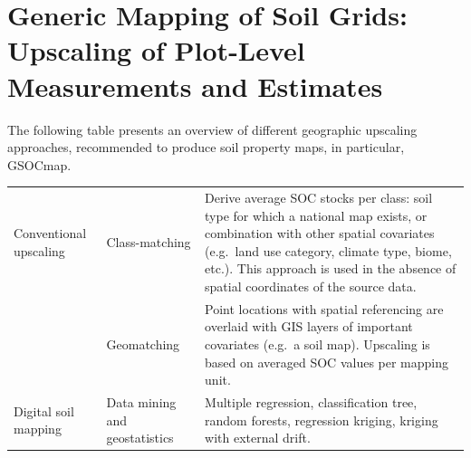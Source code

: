 \documentclass[10pt,b5paper,]{book}
\theoremstyle{definition}
\theoremstyle{definition}
\theoremstyle{definition}
\theoremstyle{remark}
\begin{document}
\hypertarget{generic-mapping-of-soil-grids-upscaling-of-plot-level-measurements-and-estimates}{%
\section{Generic Mapping of Soil Grids: Upscaling of Plot-Level
Measurements and
Estimates}\label{generic-mapping-of-soil-grids-upscaling-of-plot-level-measurements-and-estimates}}

The following table presents an overview of different geographic
upscaling approaches, recommended to produce soil property maps, in
particular, GSOCmap.

\begin{longtable}[]{@{}lll@{}}
\toprule
\endhead
\begin{minipage}[t]{0.20\columnwidth}\raggedright
Conventional upscaling \citep{lettens2004soil}\strut
\end{minipage} & \begin{minipage}[t]{0.27\columnwidth}\raggedright
Class-matching\strut
\end{minipage} & \begin{minipage}[t]{0.44\columnwidth}\raggedright
Derive average SOC stocks per class: soil type for which a national map
exists, or combination with other spatial covariates (e.g.~land use
category, climate type, biome, etc.). This approach is used in the
absence of spatial coordinates of the source data.\strut
\end{minipage}\tabularnewline
\begin{minipage}[t]{0.20\columnwidth}\raggedright
\strut
\end{minipage} & \begin{minipage}[t]{0.27\columnwidth}\raggedright
Geomatching\strut
\end{minipage} & \begin{minipage}[t]{0.44\columnwidth}\raggedright
Point locations with spatial referencing are overlaid with GIS layers of
important covariates (e.g.~a soil map). Upscaling is based on averaged
SOC values per mapping unit.\strut
\end{minipage}\tabularnewline
\begin{minipage}[t]{0.20\columnwidth}\raggedright
Digital soil mapping \citep{dobos2006digital}\strut
\end{minipage} & \begin{minipage}[t]{0.27\columnwidth}\raggedright
Data mining and geostatistics\strut
\end{minipage} & \begin{minipage}[t]{0.44\columnwidth}\raggedright
Multiple regression, classification tree, random forests, regression
kriging, kriging with external drift.\strut
\end{minipage}\tabularnewline
\bottomrule
\end{longtable}
\end{document}
